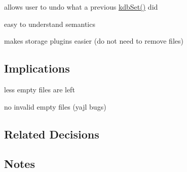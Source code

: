 \begin{DoxyItemize}
\item allows user to undo what a previous \hyperlink{group__kdb_ga11436b058408f83d303ca5e996832bcf}{kdb\+Set()} did
\item easy to understand semantics
\item makes storage plugins easier (do not need to remove files)
\end{DoxyItemize}

\subsection*{Implications}


\begin{DoxyItemize}
\item less empty files are left
\item no invalid empty files (yajl bugs)
\end{DoxyItemize}

\subsection*{Related Decisions}

\subsection*{Notes}